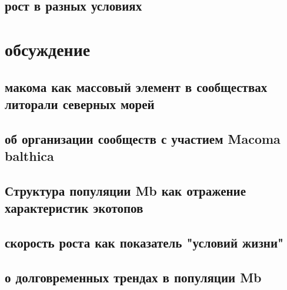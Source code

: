 \documentclass[12pt, a4paper]{article}
\begin{document}
        \subsection{рост в разных условиях}


\section{обсуждение}

        \subsection{макома как массовый элемент в сообществах литорали северных морей}

        \subsection{об организации сообществ с участием Macoma balthica}

        \subsection{Структура популяции Mb как отражение характеристик экотопов}

        \subsection{скорость роста как показатель "условий жизни"}

        \subsection{о долговременных трендах в популяции Mb}
		
\end{document}
